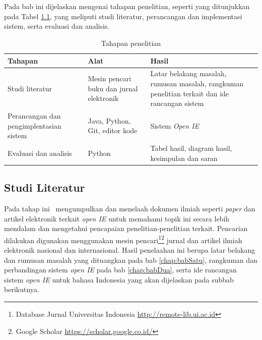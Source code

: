 \chapter{\babTiga}
\label{chap:babTiga}

Pada bab ini dijelaskan mengenai tahapan penelitian, seperti yang ditunjukkan pada Tabel \ref{tab:tahapan_penelitian}, yang meliputi studi literatur, perancangan dan implementasi sistem, serta evaluasi dan analisis.

\begin{table}
\centering
\caption{Tahapan penelitian}
\label{tab:tahapan_penelitian}
\begin{tabular}{p{3.5cm} p{4.5cm} p{4.5cm}}
\hline
\textbf{Tahapan} & \textbf{Alat} & \textbf{Hasil} \\
\hline
Studi literatur & Mesin pencari buku dan jurnal elektronik & Latar belakang masalah, rumusan masalah, rangkuman penelitian terkait dan ide rancangan sistem \\
\hline
Perancangan dan pengimplentasian sistem & Java, Python, Git, editor kode & Sistem \textit{Open IE} \\
\hline
Evaluasi dan analisis & Python & Tabel hasil, diagram hasil, kesimpulan dan saran \\
\hline
\end{tabular}
\end{table}

\section{Studi Literatur}

Pada tahap ini \saya~mengumpulkan dan menelaah dokumen ilmiah seperti \textit{paper} dan artikel elektronik terkait \textit{open IE} untuk memahami topik ini secara lebih mendalam dan mengetahui pencapaian penelitian-penelitian terkait. Pencarian dilakukan digunakan menggunakan mesin pencari\footnote{Database Jurnal Universitas Indonesia \url{http://remote-lib.ui.ac.id}}\footnote{Google Scholar \url{https://scholar.google.co.id/}} jurnal dan artikel ilmiah elektronik nasional dan internasional. Hasil penelaahan ini berupa latar belakang dan rumusan masalah yang dituangkan pada bab \ref{chap:babSatu}, rangkuman dan perbandingan sistem \textit{open IE} pada bab \ref{chap:babDua}, serta ide rancangan sistem \textit{open IE} untuk bahasa Indonesia yang akan dijelaskan pada subbab berikutnya.


